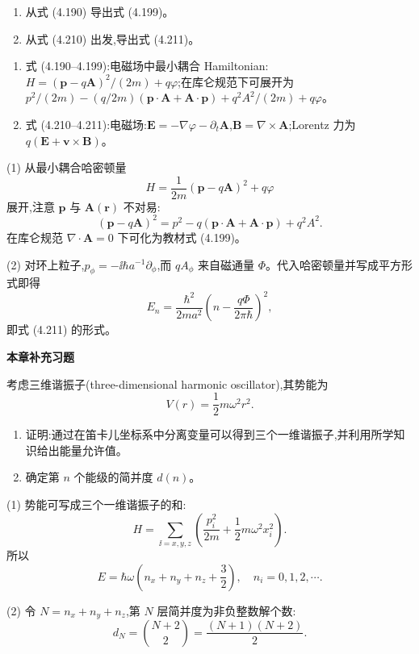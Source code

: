 \begin{question}
\begin{enumerate}
\item 从式 (4.190) 导出式 (4.199)。
\item 从式 (4.210) 出发,导出式 (4.211)。
\end{enumerate}

\par\smallskip
{}
\begin{enumerate}[leftmargin=2.2em,itemsep=0.12em,topsep=0.12em,parsep=0pt]
\item 式 (4.190--4.199):电磁场中最小耦合 Hamiltonian:$H=(\mathbf p-q\mathbf A)^2/(2m)+q\varphi$;在库仑规范下可展开为 $p^2/(2m)-(q/2m)(\mathbf p\cdot\mathbf A+\mathbf A\cdot\mathbf p)+q^2A^2/(2m)+q\varphi$。
\item 式 (4.210--4.211):电磁场:$\mathbf E=-\nabla\varphi-\partial_t\mathbf A$,$\mathbf B=\nabla\times\mathbf A$;Lorentz 力为 $q(\mathbf E+\mathbf v\times\mathbf B)$。
\end{enumerate}

\begin{solution}

(1) 从最小耦合哈密顿量
\[
H=\frac{1}{2m}(\mathbf p-q\mathbf A)^2+q\varphi
\]
展开,注意 $\mathbf p$ 与 $\mathbf A(\mathbf r)$ 不对易:
\[
(\mathbf p-q\mathbf A)^2=p^2-q(\mathbf p\cdot\mathbf A+
\mathbf A\cdot\mathbf p)+q^2A^2.
\]
在库仑规范 $\nabla\cdot\mathbf A=0$ 下可化为教材式 (4.199)。

(2) 对环上粒子,$p_\phi=-\ii\hbar a^{-1}\partial_\phi$,而 $qA_\phi$ 来自磁通量 $\Phi$。代入哈密顿量并写成平方形式即得
\[
E_n=\frac{\hbar^2}{2ma^2}\left(n-\frac{q\Phi}{2\pi\hbar}\right)^2,
\]
即式 (4.211) 的形式。

\end{solution}
\end{question}

\begin{center}\Large\bfseries 本章补充习题\end{center}

\begin{question}
考虑三维谐振子(three-dimensional harmonic oscillator),其势能为
\[
V(r)=\frac12m\omega^2r^2.
\]
\begin{enumerate}
\item 证明:通过在笛卡儿坐标系中分离变量可以得到三个一维谐振子,并利用所学知识给出能量允许值。
\item 确定第 $n$ 个能级的简并度 $d(n)$。
\end{enumerate}
\begin{solution}

(1) 势能可写成三个一维谐振子的和:
\[
H=\sum_{\ii=x,y,z}\left(\frac{p_i^2}{2m}+\frac12m\omega^2x_i^2\right).
\]
所以
\[
E=\hbar\omega\left(n_x+n_y+n_z+\frac32\right),
\quad n_i=0,1,2,\cdots.
\]

(2) 令 $N=n_x+n_y+n_z$,第 $N$ 层简并度为非负整数解个数:
\[
d_N=\binom{N+2}{2}=\frac{(N+1)(N+2)}{2}.
\]

\end{solution}
\end{question}

